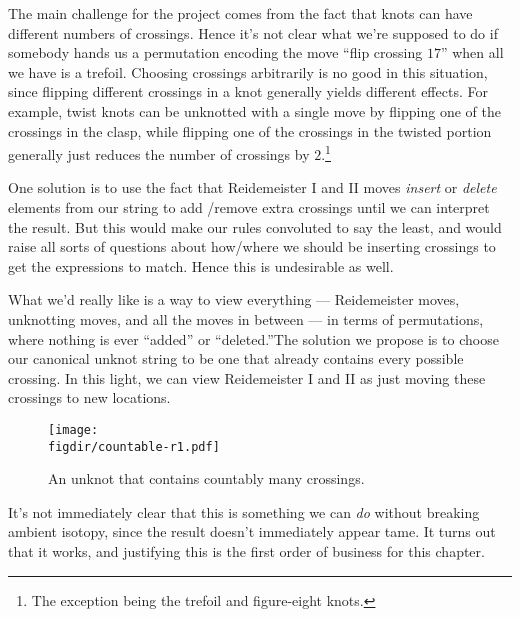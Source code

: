 
The main challenge for the project comes from the fact that knots can
have different numbers of crossings. Hence it's not clear what we're
supposed to do if somebody hands us a permutation encoding the move
``flip crossing $17$'' when all we have is a trefoil. Choosing
crossings arbitrarily is no good in this situation, since flipping
different crossings in a knot generally yields different effects. For
example, twist knots can be unknotted with a single move by flipping
one of the crossings in the clasp, while flipping one of the crossings
in the twisted portion generally just reduces the number of crossings
by $2$.\footnote{The exception being the trefoil and figure-eight
  knots.}

One solution is to use the fact that Reidemeister I and II moves
\emph{insert} or \emph{delete} elements from our string to add /remove
extra crossings until we can interpret the result. But this would make
our rules convoluted to say the least, and would raise all sorts of
questions about how/where we should be inserting crossings to get the
expressions to match. Hence this is undesirable as well.

What we'd really like is a way to view everything --- Reidemeister
moves, unknotting moves, and all the moves in between --- in terms of
permutations, where nothing is ever ``added'' or ``deleted.''The
solution we propose is to choose our canonical unknot string to be one
that already contains every possible crossing. In this light, we can
view Reidemeister I and II as just moving these crossings to new
locations.
\begin{figure}[H]
  \centering
  \texttt{[image: \\figdir/countable-r1.pdf]}
  \caption{An unknot that contains countably many crossings.}
\end{figure}
It's not immediately clear that this is something we can \emph{do}
without breaking ambient isotopy, since the result doesn't immediately
appear tame. It turns out that it works, and justifying this is the
first order of business for this chapter.

